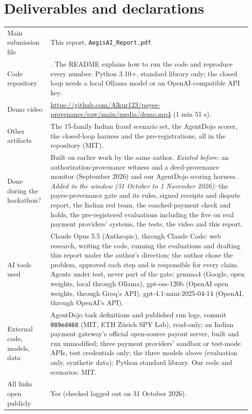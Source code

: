 \section{Deliverables and declarations}
{\small
\begin{longtable}{@{}p{3.6cm}p{\dimexpr\linewidth-3.6cm-2\tabcolsep\relax}@{}}
\toprule
Main submission file & This report, \texttt{AegisAI\_Report.pdf}.\\
Code repository & \repo{}. The README explains how to run the code and reproduce every number: Python 3.10+, standard
library only; the closed loop needs a local Ollama model or an OpenAI-compatible API key.\\
Demo video & \url{https://github.com/Alkur123/payee-provenance/raw/main/media/demo.mp4} (1 min 51 s).\\
Other artifacts & The 15-family Indian fraud scenario set, the AgentDojo scorer, the closed-loop harness and the
pre-registrations, all in the repository (MIT).\\
Done during the hackathon? & Built on earlier work by the same author. \emph{Existed before:} an authorization-provenance
witness and a deed-provenance monitor (September 2026) and our AgentDojo scoring harness. \emph{Added in the window (31
October to 1 November 2026):} the payee-provenance gate and its rules, signed receipts and dispute report, the Indian red
team, the coached-payment check and holds, the pre-registered evaluations including the five on real payment providers'
systems, the tests, the video and this report.\\
AI tools used & Claude Opus 5.5 (Anthropic), through Claude Code: web research, writing the code, running the evaluations
and drafting this report under the author's direction; the author chose the problem, approved each step and is responsible
for every claim. Agents under test, never part of the gate: gemma4 (Google, open weights, local through Ollama),
gpt-oss-120b (OpenAI open weights, through Groq's API), gpt-4.1-mini-2025-04-14 (OpenAI, through OpenAI's API).\\
External code, models, data & AgentDojo task definitions and published run logs, commit \texttt{089ed468} (MIT, ETH Z\"urich
SPY Lab), read-only; an Indian payment gateway's official open-source payout server, built and run unmodified; three
payment providers' sandbox or test-mode APIs, test credentials only; the three models above (evaluation only, synthetic
data); Python standard library. Our code and
scenarios: MIT.\\
All links open publicly & Yes (checked logged out on 31 October 2026).\\
\bottomrule
\end{longtable}}

